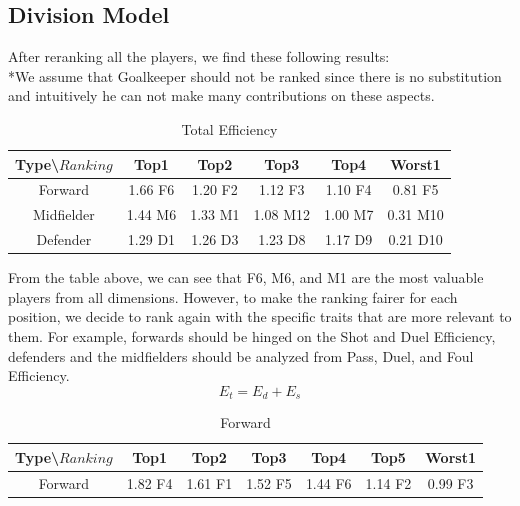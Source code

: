 \documentclass[12pt]{article}
\begin{document}
\subsection{Division Model}
After reranking all the players, we find these following results:\\
\newline
*We assume that Goalkeeper should not be ranked since there is no substitution and intuitively he can not make many contributions on these aspects. \\
\newline
\begin{table}[ht]
\begin{center}
\begin{tabular}{|c|c|c|c|c|c|}
\hline
Type\backslash $Ranking$ & Top1 & Top2 & Top3 & Top4 & Worst1\\
\hline
Forward & 1.66 F6 & 1.20 F2 & 1.12 F3 & 1.10 F4& 0.81 F5\\
\hline
Midfielder & 1.44 M6 & 1.33 M1 & 1.08 M12 & 1.00 M7 & 0.31 M10\\
\hline
Defender & 1.29 D1 & 1.26 D3 & 1.23 D8 & 1.17 D9 & 0.21 D10\\
\hline
\end{tabular}
\caption{Total Efficiency}
\end{center}
\end{table}
\newline
From the table above, we can see that F6, M6, and M1 are the most valuable players from all dimensions. However, to make the ranking fairer for each position, we decide to rank again with the specific traits that are more relevant to them. For example, forwards should be hinged on the Shot and Duel Efficiency, defenders and the midfielders should be analyzed from Pass, Duel, and Foul Efficiency. 
\begin{equation*}
 E_t= E_d + E_s
\end{equation*}
\begin{table}[ht]
\begin{center}
\begin{tabular}{|c|c|c|c|c|c|c|}
\hline
Type\backslash $Ranking$ & Top1 & Top2 & Top3 & Top4 & Top5 & Worst1\\
\hline
Forward & 1.82 F4 & 1.61 F1 & 1.52 F5 & 1.44 F6& 1.14 F2 & 0.99 F3\\
\hline
\end{tabular}
\caption{Forward}
\end{center}
\end{table}\newline
\end{document}
